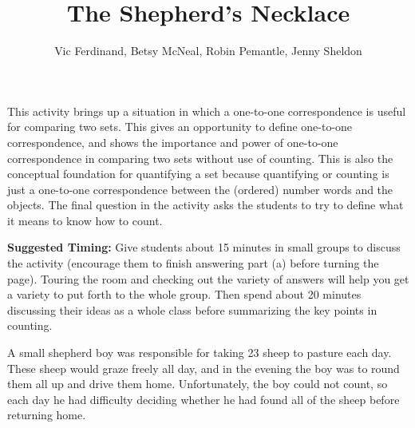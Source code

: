 \documentclass{ximera}
\title{The Shepherd's Necklace}
\author{Vic Ferdinand, Betsy McNeal, Robin Pemantle, Jenny Sheldon}
\begin{document}
\begin{abstract}\end{abstract}
\maketitle

\begin{instructorIntro}
This activity brings up a situation in which a one-to-one correspondence is useful for comparing two sets.  This gives an opportunity to define one-to-one correspondence, and shows the importance and power of one-to-one correspondence in comparing two sets without use of counting.  This is also the conceptual foundation for quantifying a set because quantifying or counting is just a one-to-one correspondence between the (ordered) number words and the objects.  The final question in the activity asks the students to try to define what it means to know how to count.

{\bf Suggested Timing:} Give students about 15 minutes in small groups to discuss the activity (encourage them to finish answering part (a) before turning the page).  Touring the room and checking out the variety of answers will help you get a variety to put forth to the whole group.  Then spend about 20 minutes discussing their ideas as a whole class before summarizing the key points in counting.  
\end{instructorIntro}


A small shepherd boy was responsible for taking 23 sheep to pasture each day.  These sheep would graze freely all day, and in the evening the boy was to round them all up and drive them home.  Unfortunately, the boy could not count, so each day he had difficulty deciding whether he had found all of the sheep before returning home. 
\end{document}
